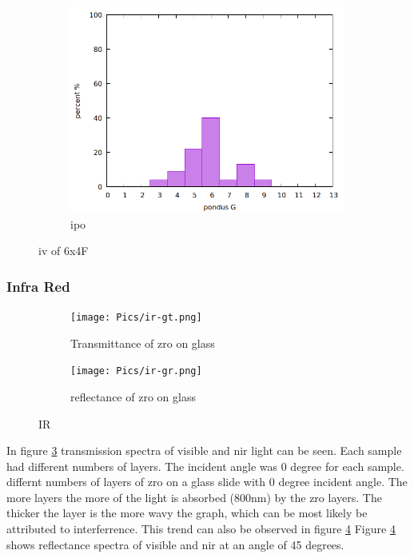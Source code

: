 \begin{figure}
\begin{subfigure}{.3\textwidth}
    \end{subfigure}
    \begin{subfigure}{.3\textwidth}
        \includegraphics[width=\textwidth]{Pics/iv/iv-192-ipo.png}
        \caption{ipo} \label{fig:ipo}
    \end{subfigure}
    \caption{iv of 6x4F} \label{fig:iv-ipo}
\end{figure}

\subsubsection{Infra Red}

\begin{figure}
    \centering
    \begin{subfigure}{.49\textwidth}
        \centering
        \texttt{[image: Pics/ir-gt.png]}
        \caption{Transmittance of \gls{zro} on glass} \label{fig:ir-gt}
    \end{subfigure}
    \begin{subfigure}{.49\textwidth}
        \centering
        \texttt{[image: Pics/ir-gr.png]}
        \caption{reflectance of \gls{zro} on glass} \label{fig:ir-gr}
    \end{subfigure}
    \caption{IR} \label{fig:ir}
\end{figure}


In figure \ref{fig:ir-gt} transmission spectra of visible and \gls{nir} light can be seen. 
Each sample had different numbers of layers. 
The incident angle was 0 degree for each sample.
differnt numbers of layers of \gls{zro} on a glass slide with 0 degree incident angle. 
The more layers the more of the light is absorbed (800nm) by the \gls{zro} layers. 
The thicker the layer is the more wavy the graph, which can be most likely be attributed to interferrence. 
This trend can also be observed in figure \ref{fig:ir-gr}
Figure \ref{fig:ir-gr} shows reflectance spectra of visible and \gls{nir} at an angle of 45 degrees. 


